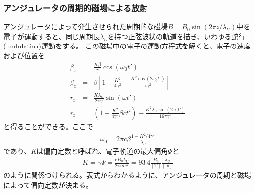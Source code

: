 \documentclass[a4paper,11pt,uplatex]{jsbook}
\begin{document}
\subsubsection{アンジュレータの周期的磁場による放射}\label{sec:undulator radiation}
アンジュレータによって発生させられた周期的な磁場$B = B_0 \sin(2\pi z/\lambda_U)$中を電子が運動すると、同じ周期長$\lambda_U$を持つ正弦波状の軌道を描き、いわゆる蛇行(undulation)運動をする。
この磁場中の電子の運動方程式を解くと、電子の速度および位置を
\begin{eqnarray}\label{eq:undulator motion}
  \beta_x &=& \frac{K\beta}{\gamma}\cos(\omega_0 t')\\
  \beta_z &=& \beta\left[1 - \frac{K^2}{4\gamma^2} -\frac{K^2\cos (2\omega_0 t')}{4\gamma^2} \right]\\
  r_x &=& \frac{K\lambda_U}{2\pi \gamma}\sin(\omega t')\\
  r_z &=& \left(1-\frac{K^2}{4\gamma^2}\beta c t'\right) - \frac{K^2\lambda_U \sin(2\omega_0 t')}{16\pi \gamma^2}
\end{eqnarray}
と得ることができる。ここで
\begin{eqnarray}
  \omega_0 = 2\pi c\beta \frac{1-K^2/4\gamma^2}{\lambda_U}
\end{eqnarray}
であり、$K$は偏向定数と呼ばれ、電子軌道の最大偏角$\Psi$と
\begin{eqnarray}
  K = \gamma \Psi = \frac{eB_0\lambda_U}{2\pi m c^2} = 93.4 \frac{B_0}{[\text{T}]}\frac{\lambda_U}{[\text{m}]}
\end{eqnarray}\label{eq:K}
のように関係づけられる。表式からわかるように、アンジュレータの周期と磁場によって偏向定数が決まる。
\end{document}
